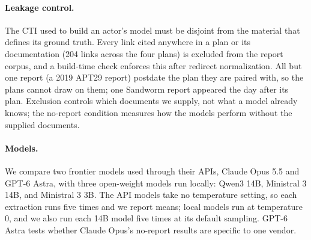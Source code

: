 \documentclass[letterpaper]{article}
\begin{document}
\paragraph{Leakage control.} The CTI used to build an actor's model must be disjoint from the material that defines its ground truth. Every link cited anywhere in a plan or its documentation (204 links across the four plans) is excluded from the report corpus, and a build-time check enforces this after redirect normalization. All but one report (a 2019 APT29 report) postdate the plan they are paired with, so the plans cannot draw on them; one Sandworm report appeared the day after its plan. Exclusion controls which documents we supply, not what a model already knows; the no-report condition measures how the models perform without the supplied documents.

\paragraph{Models.} We compare two frontier models used through their APIs, Claude Opus 5.5 and GPT-6 Astra, with three open-weight models run locally: Qwen3 14B, Ministral 3 14B, and Ministral 3 3B. The API models take no temperature setting, so each extraction runs five times and we report means; local models run at temperature 0, and we also run each 14B model five times at its default sampling. GPT-6 Astra tests whether Claude Opus's no-report results are specific to one vendor.
\end{document}
